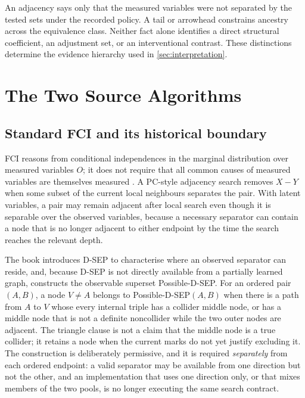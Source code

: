 \documentclass[11pt,a4paper]{article}
\begin{document}
An adjacency says only that the measured variables were not separated by the
tested sets under the recorded policy. A tail or arrowhead constrains ancestry
across the equivalence class. Neither fact alone identifies a direct structural
coefficient, an adjustment set, or an interventional contrast. These
distinctions determine the evidence hierarchy used in
\cref{sec:interpretation}.

\section{The Two Source Algorithms}
\label{sec:sources}

\subsection{Standard FCI and its historical boundary}

FCI reasons from conditional independences in the marginal distribution over
measured variables \(O\); it does not require that all common causes of
measured variables are themselves measured
\citep[Ch.~6]{spirtes2000causation}. A PC-style adjacency search removes
\(X - Y\) when some subset of the current local neighbours separates the pair.
With latent variables, a pair may remain adjacent after local search even
though it is separable over the observed variables, because a necessary
separator can contain a node that is no longer adjacent to either endpoint by
the time the search reaches the relevant depth.

The book introduces D-SEP to characterise where an observed separator can
reside, and, because D-SEP is not directly available from a partially learned
graph, constructs the observable superset Possible-D-SEP. For an ordered pair
\((A,B)\), a node \(V \neq A\) belongs to Possible-D-SEP\((A,B)\) when there is
a path from \(A\) to \(V\) whose every internal triple has a collider middle
node, or has a middle node that is not a definite noncollider while the two
outer nodes are adjacent. The triangle clause is not a claim that the middle
node is a true collider; it retains a node when the current marks do not yet
justify excluding it. The construction is deliberately permissive, and it is
required \emph{separately} from each ordered endpoint: a valid separator may be
available from one direction but not the other, and an implementation that uses
one direction only, or that mixes members of the two pools, is no longer
executing the same search contract.
\end{document}
